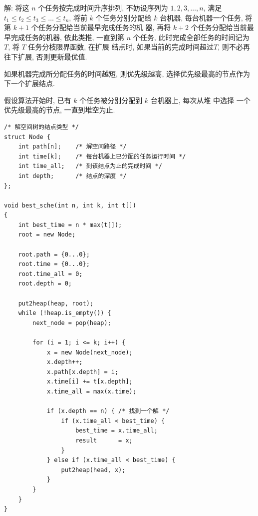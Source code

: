 \documentclass[nofonts, a4paper]{ctexart}
\begin{document}
解: 将这 $n$ 个任务按完成时间升序排列, 不妨设序列为 $1, 2, 3, \dots , n$,
满足 $ t_1 \le t_2 \le t_3 \le \dots \le t_n $, 将前 $k$ 个任务分别分配给 
$k$ 台机器, 每台机器一个任务, 将第 $k+1$ 个任务分配给当前最早完成任务的机
器, 再将 $k+2$ 个任务分配给当前最早完成任务的机器, 依此类推, 一直到第 $n$
个任务, 此时完成全部任务的时间记为 $T$, 将 $T$ 任务分枝限界函数, 在扩展
结点时, 如果当前的完成时间超过$T$, 则不必再往下扩展, 否则更新最优值.

如果机器完成所分配任务的时间越短, 则优先级越高, 选择优先级最高的节点作为
下一个扩展结点.

假设算法开始时, 已有 $k$ 个任务被分别分配到 $k$ 台机器上, 每次从堆 中选择
一个优先级最高的节点, 一直到堆空为止.
\linespread{0.8}
\begin{verbatim}
/* 解空间树的结点类型 */
struct Node {
    int path[n];    /* 解空间路径 */
    int time[k];    /* 每台机器上已分配的任务运行时间 */
    int time_all;   /* 到该结点为止的完成时间 */
    int depth;      /* 结点的深度 */
};

void best_sche(int n, int k, int t[])
{
    int best_time = n * max(t[]);
    root = new Node;

    root.path = {0...0};
    root.time = {0...0};
    root.time_all = 0;
    root.depth = 0;

    put2heap(heap, root);
    while (!heap.is_empty()) {
        next_node = pop(heap);

        for (i = 1; i <= k; i++) {
            x = new Node(next_node);
            x.depth++;
            x.path[x.depth] = i;
            x.time[i] += t[x.depth];
            x.time_all = max(x.time);

            if (x.depth == n) { /* 找到一个解 */
                if (x.time_all < best_time) {
                    best_time = x.time_all;
                    result      = x;
                }
            } else if (x.time_all < best_time) {
                put2heap(head, x);
            }
        }
    }
}
\end{verbatim}
\end{document}
